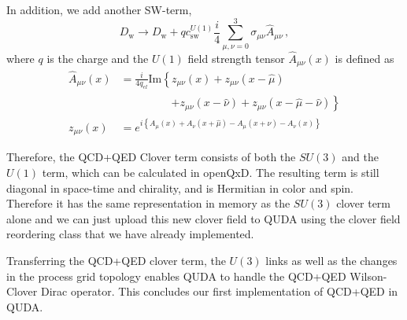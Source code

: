 In addition, we add another SW-term,
\begin{equation} \label{eq:Dw2}
D_\mathrm{w} \rightarrow D_\mathrm{w} + q c_\mathrm{sw}^{U(1)} \frac{i}{4} \sum_{\mu,\nu=0}^3 \sigma_{\mu \nu} \hat{A}_{\mu \nu}\,,
\end{equation}
where $q$ is the charge and the $U(1)$ field strength tensor $\hat{A}_{\mu \nu}(x)$ is defined as
\begin{align*}
\hat{A}_{\mu \nu}(x) &= \frac{i}{4 q_{el}} \text{Im} \left\{
      z_{\mu \nu}(x)
    + z_{\mu \nu}(x-\hat{\mu})
    \right. \\
    &\phantom{=\frac{i}{4 q_{\text{el}}} \text{Im} \left\{ \right.} \left. 
    + z_{\mu \nu}(x-\hat{\nu})
    + z_{\mu \nu}(x-\hat{\mu}-\hat{\nu})
\right\} \\
z_{\mu \nu}(x) &= e^{i\left\{
      A_{\mu}(x)
    + A_{\nu}(x+\hat{\mu})
    - A_{\mu}(x+\hat{\nu})
    - A_{\nu}(x)
\right\}}
\end{align*}

Therefore, the QCD+QED Clover term consists of both the $SU(3)$ and the $U(1)$ term, which can be calculated in openQxD. The resulting term is still diagonal in space-time and chirality, and is Hermitian in color and spin. Therefore it has the same representation in memory as the $SU(3)$ clover term alone and we can just upload this new clover field to QUDA using the clover field reordering class that we have already implemented.

Transferring the QCD+QED clover term, the $U(3)$ links as well as the changes in the process grid topology enables QUDA to handle the QCD+QED Wilson-Clover Dirac operator. This concludes our first implementation of QCD+QED in QUDA.
